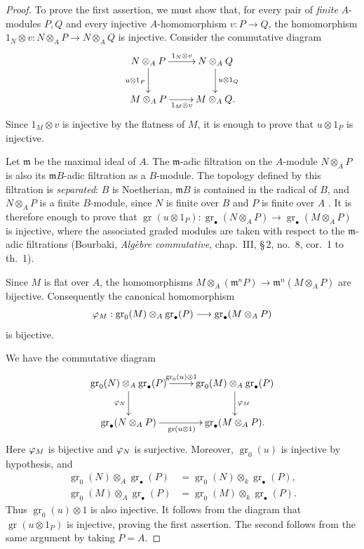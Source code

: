 \begin{proof}
To prove the first assertion, we must show that, for every pair of
\emph{finite} $A$-modules $P,Q$ and every injective $A$-homomorphism
$v:P\to Q$, the homomorphism $1_N\otimes v:N\otimes_A P\longrightarrow N\otimes_A Q$
is injective.  Consider the commutative diagram
\[
  \xymatrix{
    N\otimes_A P
      \ar[r]^-{1_N\otimes v}
      \ar[d]_{u\otimes1_P}
      &
    N\otimes_A Q
      \ar[d]^{u\otimes1_Q}
    \\
    M\otimes_A P
      \ar[r]_{1_M\otimes v}
      &
    M\otimes_A Q .
  }
\]
Since $1_M\otimes v$ is injective by the flatness of $M$, it is
enough to prove that $u\otimes1_P$ is injective.

Let $\mathfrak m$ be the maximal ideal of $A$.  The
$\mathfrak m$-adic filtration on the $A$-module $N\otimes_A P$ is
also its $\mathfrak mB$-adic filtration as a $B$-module.  The
topology defined by this filtration is \emph{separated}: $B$ is
Noetherian, $\mathfrak mB$ is contained in the radical of $B$, and
$N\otimes_A P$ is a finite $B$-module, since $N$ is finite over $B$
and $P$ is finite over $A$ .  It is therefore
enough to prove that $\operatorname{gr}(u\otimes1_P):
\operatorname{gr}_\bullet(N\otimes_AP)
\longrightarrow
\operatorname{gr}_\bullet(M\otimes_AP)$
is injective, where the associated graded modules are taken with
respect to the $\mathfrak m$-adic filtrations (Bourbaki,
\emph{Alg\`ebre commutative}, chap.~III, \S\,2, no.~8, cor.~1 to
th.~1).

Since $M$ is flat over $A$, the homomorphisms $M\otimes_A(\mathfrak m^nP)
\longrightarrow
\mathfrak m^n(M\otimes_AP)$
are bijective.  Consequently the canonical homomorphism
\[
  \varphi_M:
  \operatorname{gr}_0(M)\otimes_A\operatorname{gr}_\bullet(P)
  \longrightarrow
  \operatorname{gr}_\bullet(M\otimes_A P)
\]
is bijective.


We have the commutative diagram
\[
  \xymatrix{
    \operatorname{gr}_0(N)\otimes_A\operatorname{gr}_\bullet(P)
      \ar[r]^-{\operatorname{gr}_0(u)\otimes1}
      \ar[d]_{\vphi_N}
      &
    \operatorname{gr}_0(M)\otimes_A\operatorname{gr}_\bullet(P)
      \ar[d]^{\vphi_M}
    \\
    \operatorname{gr}_\bullet(N\otimes_A P)
      \ar[r]_{\operatorname{gr}(u\otimes1)}
      &
    \operatorname{gr}_\bullet(M\otimes_A P).
  }
\]
Here $\varphi_M$ is bijective and $\varphi_N$ is surjective.
Moreover, $\operatorname{gr}_0(u)$ is injective by hypothesis, and
\[
\begin{split}
  \operatorname{gr}_0(N)\otimes_A\operatorname{gr}_\bullet(P)
    &=
  \operatorname{gr}_0(N)\otimes_k\operatorname{gr}_\bullet(P),\\
  \operatorname{gr}_0(M)\otimes_A\operatorname{gr}_\bullet(P)
    &=
  \operatorname{gr}_0(M)\otimes_k\operatorname{gr}_\bullet(P).
\end{split}
\]
Thus $\operatorname{gr}_0(u)\otimes1$ is also injective.  It
follows from the diagram that $\operatorname{gr}(u\otimes1_P)$ is
injective, proving the first assertion.  The second follows from
the same argument by taking $P=A$.
\end{proof}

